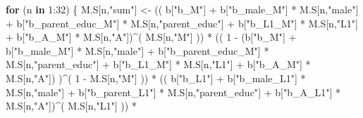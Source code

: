 \documentclass[
]{book}
\newenvironment{Shaded}{\begin{snugshade}}{\end{snugshade}}
\newcommand{\ControlFlowTok}[1]{\textcolor[rgb]{0.13,0.29,0.53}{\textbf{#1}}}
\newcommand{\DecValTok}[1]{\textcolor[rgb]{0.00,0.00,0.81}{#1}}
\newcommand{\NormalTok}[1]{#1}
\newcommand{\OtherTok}[1]{\textcolor[rgb]{0.56,0.35,0.01}{#1}}
\newcommand{\SpecialCharTok}[1]{\textcolor[rgb]{0.00,0.00,0.00}{#1}}
\newcommand{\StringTok}[1]{\textcolor[rgb]{0.31,0.60,0.02}{#1}}
\begin{document}
\begin{Shaded}
\begin{Highlighting}[]
  \ControlFlowTok{for}\NormalTok{ (n }\ControlFlowTok{in} \DecValTok{1}\SpecialCharTok{:}\DecValTok{32}\NormalTok{) \{}
\NormalTok{    M.S[n,}\StringTok{"sum"}\NormalTok{] }\OtherTok{\textless{}{-}}\NormalTok{ (( b[}\StringTok{"b\_M"}\NormalTok{] }\SpecialCharTok{+}                                                              
\NormalTok{                         b[}\StringTok{"b\_male\_M"}\NormalTok{] }\SpecialCharTok{*}\NormalTok{ M.S[n,}\StringTok{"male"}\NormalTok{] }\SpecialCharTok{+} 
\NormalTok{                         b[}\StringTok{"b\_parent\_educ\_M"}\NormalTok{] }\SpecialCharTok{*}\NormalTok{ M.S[n,}\StringTok{"parent\_educ"}\NormalTok{] }\SpecialCharTok{+} 
\NormalTok{                         b[}\StringTok{"b\_L1\_M"}\NormalTok{] }\SpecialCharTok{*}\NormalTok{ M.S[n,}\StringTok{"L1"}\NormalTok{] }\SpecialCharTok{+}
\NormalTok{                         b[}\StringTok{"b\_A\_M"}\NormalTok{] }\SpecialCharTok{*}\NormalTok{ M.S[n,}\StringTok{"A"}\NormalTok{])}\SpecialCharTok{\^{}}\NormalTok{( M.S[n,}\StringTok{"M"}\NormalTok{] )) }\SpecialCharTok{*}
\NormalTok{      (( }\DecValTok{1} \SpecialCharTok{{-}}\NormalTok{ (b[}\StringTok{"b\_M"}\NormalTok{] }\SpecialCharTok{+} 
\NormalTok{                b[}\StringTok{"b\_male\_M"}\NormalTok{] }\SpecialCharTok{*}\NormalTok{ M.S[n,}\StringTok{"male"}\NormalTok{] }\SpecialCharTok{+} 
\NormalTok{                b[}\StringTok{"b\_parent\_educ\_M"}\NormalTok{] }\SpecialCharTok{*}\NormalTok{ M.S[n,}\StringTok{"parent\_educ"}\NormalTok{] }\SpecialCharTok{+} 
\NormalTok{                b[}\StringTok{"b\_L1\_M"}\NormalTok{] }\SpecialCharTok{*}\NormalTok{ M.S[n,}\StringTok{"L1"}\NormalTok{] }\SpecialCharTok{+}
\NormalTok{                b[}\StringTok{"b\_A\_M"}\NormalTok{] }\SpecialCharTok{*}\NormalTok{ M.S[n,}\StringTok{"A"}\NormalTok{]) )}\SpecialCharTok{\^{}}\NormalTok{( }\DecValTok{1} \SpecialCharTok{{-}}\NormalTok{ M.S[n,}\StringTok{"M"}\NormalTok{] )) }\SpecialCharTok{*}
\NormalTok{      (( b[}\StringTok{"b\_L1"}\NormalTok{] }\SpecialCharTok{+}                                                           
\NormalTok{           b[}\StringTok{"b\_male\_L1"}\NormalTok{] }\SpecialCharTok{*}\NormalTok{ M.S[n,}\StringTok{"male"}\NormalTok{] }\SpecialCharTok{+}  
\NormalTok{           b[}\StringTok{"b\_parent\_L1"}\NormalTok{] }\SpecialCharTok{*}\NormalTok{ M.S[n,}\StringTok{"parent\_educ"}\NormalTok{] }\SpecialCharTok{+}
\NormalTok{           b[}\StringTok{"b\_A\_L1"}\NormalTok{] }\SpecialCharTok{*}\NormalTok{ M.S[n,}\StringTok{"A"}\NormalTok{])}\SpecialCharTok{\^{}}\NormalTok{( M.S[n,}\StringTok{"L1"}\NormalTok{] )) }\SpecialCharTok{*}

\end{Highlighting}
\end{Shaded}
\end{document}
